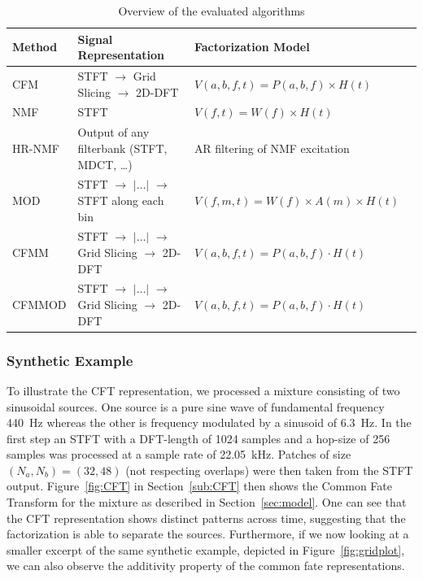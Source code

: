 \begin{table}[ht!]
  \centering
  \scriptsize
\begin{tabular}{ llll }
    \toprule
    Method & Signal Representation & Factorization Model \\
    \midrule
    CFM~\cite{stoter16} & STFT $\rightarrow$ Grid Slicing $\rightarrow$ 2D-DFT & $V(a,b,f,t) = P(a,b,f)\times H(t)$ \\
    NMF~\cite{virtanen07} & STFT & $V(f,t) = W(f)\times H(t)$ \\
    HR-NMF~\cite{badeau13} & Output of any filterbank (STFT, MDCT, \ldots)  & AR filtering of NMF excitation \\
    MOD~\cite{barker13} & STFT $\rightarrow$ $|\ldots|$ $\rightarrow$ STFT along each bin & $V(f,m,t) = W(f)\times A(m)\times H(t)$ \\
    CFMM & STFT $\rightarrow$ $|\ldots|$ $\rightarrow$ Grid Slicing $\rightarrow$ 2D-DFT & $V(a,b,f,t) = P(a,b,f)\cdot H(t)$ \\
    CFMMOD & STFT $\rightarrow$ $|\ldots|$ $\rightarrow$ Grid Slicing $\rightarrow$ 2D-DFT & $V(a,b,f,t) = P(a,b,f)\cdot H(t)$ \\
    \bottomrule
\end{tabular}
\caption{Overview of the evaluated algorithms}
\label{tab:methods}
\end{table}

\subsubsection{Synthetic Example}
\label{sub:Synthentic_Examples}

To illustrate the CFT representation, we processed a mixture consisting of two sinusoidal sources. One source is a pure sine wave of fundamental frequency 440~Hz whereas the other is frequency modulated by a sinusoid of 6.3~Hz. In the first step an STFT with a DFT-length of 1024 samples and a hop-size of 256 samples was processed at a sample rate of 22.05~kHz. Patches of size $(N_a, N_b) = (32, 48)$ (not respecting overlaps) were then taken from the STFT output. Figure~\ref{fig:CFT} in Section~\ref{sub:CFT} then shows the Common Fate Transform for the mixture as described in Section~\ref{sec:model}. One can see that the CFT representation shows distinct patterns across time, suggesting that the factorization is able to separate the sources. 
Furthermore, if we now looking at a smaller excerpt of the same synthetic example, depicted in Figure~\ref{fig:gridplot}, we can also observe the additivity property of the common fate representations.

